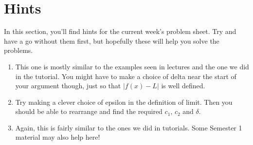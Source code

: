 \documentclass[
  17pt,
  a4paper]{extarticle}
\providecommand{\tightlist}{%
  \setlength{\itemsep}{0pt}\setlength{\parskip}{0pt}}
\theoremstyle{plain}
\theoremstyle{definition}
\theoremstyle{plain}
\theoremstyle{plain}
\theoremstyle{plain}
\theoremstyle{plain}
\theoremstyle{definition}
\theoremstyle{definition}
\theoremstyle{remark}
\theoremstyle{remark}
\renewcommand{\;}{\,}
\begin{document}
\hypertarget{hints}{%
\section{Hints}\label{hints}}

In this section, you'll find hints for the current week's problem sheet. Try and have a go without them first, but hopefully these will help you solve the problems.

\begin{enumerate}
\def\labelenumi{\arabic{enumi})}
\tightlist
\item
  This one is mostly similar to the examples seen in lectures and the one we did in the tutorial. You might have to make a choice of delta near the start of your argument though, just so that \(\lvert f(x) - L \rvert\) is well defined.
\item
  Try making a clever choice of epsilon in the definition of limit. Then you should be able to rearrange and find the required \(c_1\), \(c_2\) and \(\delta\).
\item
  Again, this is fairly similar to the ones we did in tutorials. Some Semester 1 material may also help here!
\end{enumerate}
\end{document}
